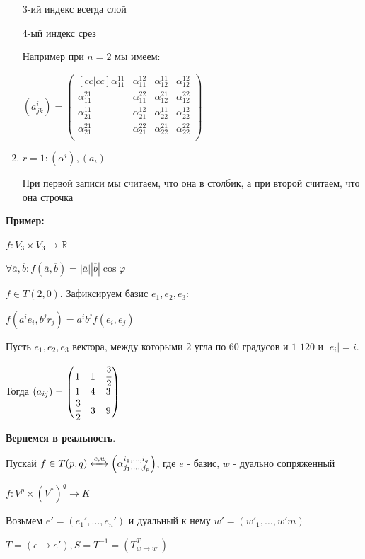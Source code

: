 \begin{enumerate}
3-ий индекс всегда слой

4-ый индекс срез 

Например при $n=2$ мы имеем:

$(a^i_{jk}) = \begin{pmatrix}[cc|cc]
  \alpha^{11}_{11} & \alpha^{12}_{11} &\alpha^{11}_{12} &\alpha^{12}_{12}\\
  \alpha^{21}_{11} & \alpha^{22}_{11} &\alpha^{21}_{12} &\alpha^{22}_{12}\\
\hline
    \alpha^{11}_{21} & \alpha^{12}_{21} &\alpha^{11}_{22} &\alpha^{12}_{22}\\
  \alpha^{21}_{21} & \alpha^{22}_{21} &\alpha^{21}_{22} &\alpha^{22}_{22}\\
\end{pmatrix}$


\item $r=1: (\alpha^i), (a_i)$ 

При первой записи мы считаем, что она в столбик, а при второй считаем, что она строчка 

\end{enumerate}


\textbf{Пример:} 

$f:V_3\times V_3 \rightarrow \mathbb{R}$

$\forall \overline{a}, \overline{b}: f(\overline{a},\overline{b}) = |\overline{a}||\overline{b}|\cos \varphi$

$f\in T(2,0)$. Зафиксируем базис $e_1,e_2,e_3$:

$f(a^ie_i,b^jr_j) = a^ib^j f(e_i,e_j)$

Пусть $e_1,e_2,e_3$ вектора, между которыми $2$ угла по $60$ градусов и $1$ $120$  и $|e_i|=i$.

Тогда $(a_{ij})= \begin{pmatrix}
    1 & 1 & \cfrac{3}{2} \\
    1 & 4& 3 \\
    \cfrac{3}{2} & 3 & 9
\end{pmatrix}$


\textbf{Вернемся в реальность}.

Пускай $f \in T(p,q) \xleftrightarrow{e,w} \left(\alpha^{i_1,\ldots,i_q}_{j_1,\ldots,j_p}\right)$, где $e$ - базис, $w$ - дуально сопряженный

$f: V^p \times (V^*)^q\rightarrow K$

Возьмем $e' = (e_1',\ldots,e_n' )$ и дуальный к нему $w'=(w'_1,\ldots, w'm)$

$T = (e\rightarrow e'), S = T^{-1} = (T_{w\to w'}^T)$


